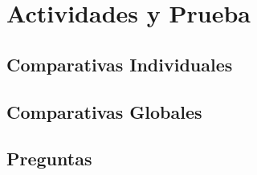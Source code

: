 \documentclass[12pt, fleqn]{article}                             %
\theoremstyle{break}                                            %
\begin{document}
\section{Actividades y Prueba}


    \subsection{Comparativas Individuales}


    \subsection{Comparativas Globales}


    \subsection{Preguntas}
\end{document}
